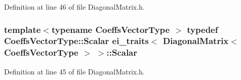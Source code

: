 Definition at line 46 of file Diagonal\-Matrix.\-h.

\hypertarget{structei__traits_3_01_diagonal_matrix_3_01_coeffs_vector_type_01_4_01_4_af4a1ab63e1b5020ce4782f748788739b}{
\subsubsection[{Scalar}]{\setlength{\rightskip}{0pt plus 5cm}template$<$typename Coeffs\-Vector\-Type $>$ typedef Coeffs\-Vector\-Type\-::\-Scalar {\bf ei\-\_\-traits}$<$ {\bf Diagonal\-Matrix}$<$ Coeffs\-Vector\-Type $>$ $>$\-::{\bf Scalar}}}\label{structei__traits_3_01_diagonal_matrix_3_01_coeffs_vector_type_01_4_01_4_af4a1ab63e1b5020ce4782f748788739b}


Definition at line 45 of file Diagonal\-Matrix.\-h.



